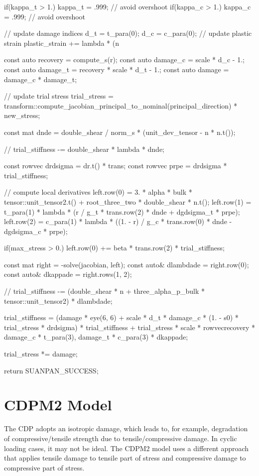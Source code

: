 \begin{cppcode}
{{		if(kappa_t > 1.) kappa_t = .999; // avoid overshoot
		if(kappa_c > 1.) kappa_c = .999; // avoid overshoot
	}

	// update damage indices
	d_t = t_para(0);
	d_c = c_para(0);
	// update plastic strain
	plastic_strain += lambda * (n %

	const auto recovery = compute_s(r);
	const auto damage_c = scale * d_c - 1.;
	const auto damage_t = recovery * scale * d_t - 1.;
	const auto damage = damage_c * damage_t;

	// update trial stress
	trial_stress = transform::compute_jacobian_principal_to_nominal(principal_direction) * new_stress;

	const mat dnde = double_shear / norm_s * (unit_dev_tensor - n * n.t());

	// 
	trial_stiffness -= double_shear * lambda * dnde;

	const rowvec drdsigma = dr.t() * trans;
	const rowvec prpe = drdsigma * trial_stiffness;

	// compute local derivatives
	left.row(0) = 3. * alpha * bulk * tensor::unit_tensor2.t() + root_three_two * double_shear * n.t();
	left.row(1) = t_para(1) * lambda * (r / g_t * trans.row(2) * dnde + dgdsigma_t * prpe);
	left.row(2) = c_para(1) * lambda * ((1. - r) / g_c * trans.row(0) * dnde - dgdsigma_c * prpe);

	if(max_stress > 0.) left.row(0) += beta * trans.row(2) * trial_stiffness;

	const mat right = -solve(jacobian, left);
	const auto& dlambdade = right.row(0);
	const auto& dkappade = right.rows(1, 2);

	// 
	trial_stiffness -= (double_shear * n + three_alpha_p_bulk * tensor::unit_tensor2) * dlambdade;

	trial_stiffness = (damage * eye(6, 6) + scale * d_t * damage_c * (1. - s0) * trial_stress * drdsigma) * trial_stiffness + trial_stress * scale * rowvec{recovery * damage_c * t_para(3), damage_t * c_para(3)} * dkappade;

	trial_stress *= damage;

	return SUANPAN_SUCCESS;
}
\end{cppcode}
\section{CDPM2 Model}
The CDP adopts an isotropic damage, which leads to, for example, degradation of compressive/tensile strength due to tensile/compressive damage. In cyclic loading cases, it may not be ideal. The CDPM2 model uses a different approach that applies tensile damage to tensile part of stress and compressive damage to compressive part of stress.
